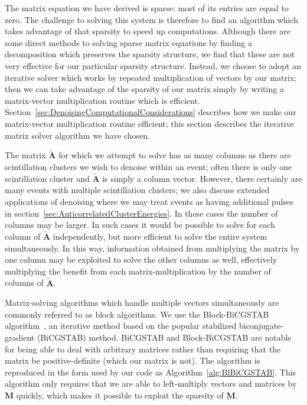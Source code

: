 The matrix equation we have derived is sparse: most of its entries are equal to zero.  The challenge to solving this system is therefore to find an algorithm which takes advantage of that sparsity to speed up computations.  Although there are some direct methods to solving sparse matrix equations by finding a decomposition which preserves the sparsity structure, we find that these are not very effective for our particular sparsity structure.  Instead, we choose to adopt an iterative solver which works by repeated multiplication of vectors by our matrix; then we can take advantage of the sparsity of our matrix simply by writing a matrix-vector multiplication routine which is efficient.  Section~\ref{sec:DenoisingComputationalConsiderations} describes how we make our matrix-vector multiplication routine efficient; this section describes the iterative matrix solver algorithm we have chosen.

The matrix $\mathbf{\widetilde{A}}$ for which we attempt to solve has as many columns as there are scintillation clusters we wish to denoise within an event; often there is only one scintillation cluster and $\mathbf{\widetilde{A}}$ is simply a column vector.  However, there certainly are many events with multiple scintillation clusters; we also discuss extended applications of denoising where we may treat events as having additional pulses in section~\ref{sec:AnticorrelatedClusterEnergies}.  In these cases the number of columns may be larger.  In such cases it would be possible to solve for each column of $\mathbf{\widetilde{A}}$ independently, but more efficient to solve the entire system simultaneously.  In this way, information obtained from multiplying the matrix by one column may be exploited to solve the other columns as well, effectively multiplying the benefit from each matrix-multiplication by the number of columns of $\mathbf{\widetilde{A}}$.

Matrix-solving algorithms which handle multiple vectors simultaneously are commonly referred to as block algorithms.  We use the Block-BiCGSTAB algorithm~\cite{BlBiCGSTAB}, an iterative method based on the popular stabilized biconjugate-gradient (BiCGSTAB) method.  BiCGSTAB and Block-BiCGSTAB are notable for being able to deal with arbitrary matrices rather than requiring that the matrix be positive-definite (which our matrix is not).  The algorithm is reproduced in the form used by our code as Algorithm~\ref{alg:BlBiCGSTAB}.  This algorithm only requires that we are able to left-multiply vectors and matrices by $\mathbf{M}$ quickly, which makes it possible to exploit the sparsity of $\mathbf{M}$.

